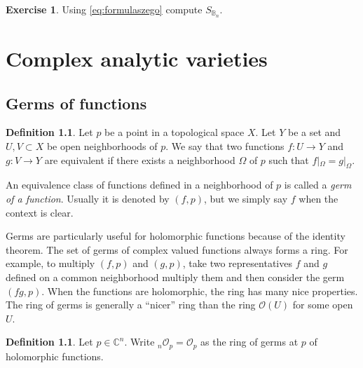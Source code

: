 \documentclass[12pt,openany]{book}
\newcommand{\C}{{\mathbb{C}}}
\newcommand{\bB}{{\mathbb{B}}}
\newcommand{\sO}{{\mathcal{O}}}
\newcommand{\myindex}[1]{#1\index{#1}}
\theoremstyle{plain}
\theoremstyle{remark}
\theoremstyle{definition}
\newtheorem{defn}[thm]{Definition}
\newenvironment{exbox}{%
    \def\FrameCommand{\vrule width 1pt \relax\hspace {10pt}}%
    \MakeFramed {\advance \hsize -\width \FrameRestore }%
}{%
    \endMakeFramed
}
\theoremstyle{exercise}
\newtheorem{exercise}{Exercise}[section]
\theoremstyle{example}
\begin{document}
\begin{exbox}
\begin{exercise}
Using \eqref{eq:formulaszego} compute $S_{\bB_n}$.
\end{exercise}
\end{exbox}

%
%
%
%


\chapter{Complex analytic varieties} \label{ch:analyticvarieties}


\section{Germs of functions}

\begin{defn}
Let $p$ be a point in a topological space $X$.  Let $Y$ be a set and
$U, V \subset X$ be open neighborhoods of $p$.  We say that
two functions $f \colon U \to Y$ and
$g \colon V \to Y$ are equivalent if there exists a neighborhood
$\Omega$ of $p$ such that $f|_\Omega = g|_\Omega$.

An equivalence class of functions defined in a neighborhood of $p$
is called a \emph{\myindex{germ of a function}}.
Usually it is denoted by $(f,p)$, but we simply say $f$ when
the context is clear.
\end{defn}

Germs are particularly useful for holomorphic functions because of the identity
theorem.  The set of germs of complex valued functions always forms a ring.
For example, to multiply $(f,p)$ and $(g,p)$, take two representatives
$f$ and $g$ defined on a common neighborhood multiply them and
then consider the germ $(fg,p)$.
When the functions are holomorphic, the ring has many nice properties.
The ring of germs is generally a ``nicer'' ring than the ring $\sO(U)$ for
some open $U$.

\begin{defn}
Let $p \in \C^n$.  Write
${}_n\sO_p = \sO_p$ as the ring of germs at $p$ of holomorphic functions.
\end{defn}
\end{document}

